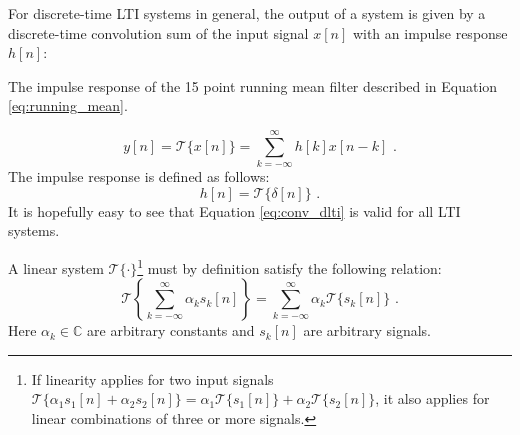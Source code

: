 For discrete-time LTI systems in general, the output of a system is given by a discrete-time 
convolution sum of the input signal $x[n]$ with an impulse response $h[n]$:

\begin{marginfigure}
  \begin{center}
  \end{center}
  \caption{The impulse response of the 15 point running mean filter described in Equation \ref{eq:running_mean}.}
\end{marginfigure}

\begin{equation}
  \boxed{
    y[n] = \mathcal{T}\{x[n]\}=\sum_{k=-\infty}^{\infty} h[k] x[n-k]\,\,.
  }
  \label{eq:conv_dlti}
\end{equation}
The impulse response is defined as follows:
\begin{equation}
  \boxed{
    h[n] = \mathcal{T}\{\delta[n]\}\,\,.
    \label{eq:conv_ireq}
  }
\end{equation}
It is hopefully easy to see that Equation \ref{eq:conv_dlti} is valid for all LTI systems. %

A linear system $\mathcal{T}\{\cdot\}$\footnote{If linearity applies for two input signals $\mathcal{T}\{\alpha_1 s_1[n] + \alpha_2 s_2[n]\} = \alpha_1 \mathcal{T}\{s_1[n]\}+\alpha_2 \mathcal{T}\{s_2[n]\}$, it also applies for linear combinations of three or more signals.} must by definition satisfy the following relation:
\begin{equation}
  \mathcal{T}\left\{\sum_{k=-\infty}^{\infty} \alpha_k s_k[n]\right\} = \sum_{k=-\infty}^{\infty} \alpha_k \mathcal{T}\{s_k[n]\}\,\,.
  \label{eq:linearity_gen}
\end{equation}
Here $\alpha_k \in \mathbb{C}$ are arbitrary constants and $s_k[n]$ are arbitrary signals.

